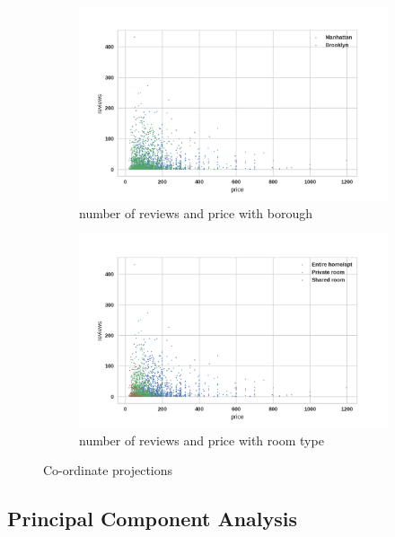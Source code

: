 \documentclass[12pt]{article}
\begin{document}
\begin{figure}
    \begin{subfigure}[b]{0.45\textwidth}
        \includegraphics[width=\textwidth]{images/pair-reviews-price1.png}
        \caption{number of reviews and price with borough}
        \label{fig:pair-reviews-price1}
    \end{subfigure}
    \begin{subfigure}[b]{0.45\textwidth}
        \includegraphics[width=\textwidth]{images/pair-reviews-price2.png}
        \caption{number of reviews and price with room type}
        \label{fig:pair-reviews-price2}
    \end{subfigure}
    \caption{Co-ordinate projections}\label{fig:Co-ordinate-projections}
\end{figure}
\subsection{Principal Component Analysis}
\end{document}

